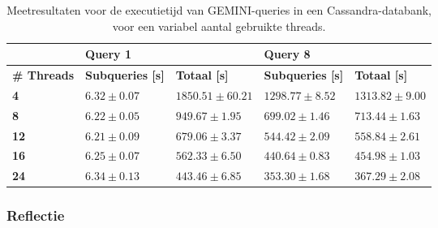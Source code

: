 \begin{table}[!h]
\centering
\begin{tabular}{@{}lllll@{}}
\cmidrule(l){2-5}
                                       & \multicolumn{2}{|l|}{\textbf{Query 1}}                                                      & \multicolumn{2}{l|}{\textbf{Query 8}}                             \\ 
\midrule
\multicolumn{1}{|l|}{\textbf{\# Threads}}  & \multicolumn{1}{l|}{\textbf{Subqueries [s]}}               & \multicolumn{1}{l|}{\textbf{Totaal [s]}} & \multicolumn{1}{l|}{\textbf{Subqueries [s]}} & \multicolumn{1}{l|}{\textbf{Totaal [s]}} \\ \midrule
\multicolumn{1}{|l|}{\textbf{4}} & \multicolumn{1}{l|}{$6.32 \pm 0.07$} & \multicolumn{1}{l|}{$1850.51 \pm 60.21$}             & \multicolumn{1}{l|}{$1298.77 \pm 8.52$}          & \multicolumn{1}{l|}{$1313.82 \pm 9.00$}                        \\
\multicolumn{1}{|l|}{\textbf{8}} & \multicolumn{1}{l|}{$6.22 \pm 0.05$} &\multicolumn{1}{l|}{$949.67 \pm 1.95$}            & \multicolumn{1}{l|}{$699.02 \pm 1.46$}          & \multicolumn{1}{l|}{$713.44 \pm 1.63$}                        \\
\multicolumn{1}{|l|}{\textbf{12}} & \multicolumn{1}{l|}{$6.21 \pm 0.09$} &\multicolumn{1}{l|}{$679.06 \pm 3.37$}            & \multicolumn{1}{l|}{$544.42 \pm 2.09$}           & \multicolumn{1}{l|}{$558.84 \pm 2.61$}                        \\
\multicolumn{1}{|l|}{\textbf{16}} & \multicolumn{1}{l|}{$6.25 \pm 0.07$} &\multicolumn{1}{l|}{$562.33 \pm 6.50$}                 & \multicolumn{1}{l|}{$440.64 \pm 0.83$}                    & \multicolumn{1}{l|}{$454.98 \pm 1.03$}                        \\
\multicolumn{1}{|l|}{\textbf{24}} & \multicolumn{1}{l|}{$6.34 \pm 0.13$} &\multicolumn{1}{l|}{$443.46 \pm 6.85$}          & \multicolumn{1}{l|}{$353.30 \pm 1.68$}           & \multicolumn{1}{l|}{$367.29 \pm 2.08$}                        \\
\bottomrule
\end{tabular}
\caption{Meetresultaten voor de executietijd van GEMINI-queries in een Cassandra-databank, voor een variabel aantal gebruikte threads.}
\end{table}

\subsubsection{Reflectie}

